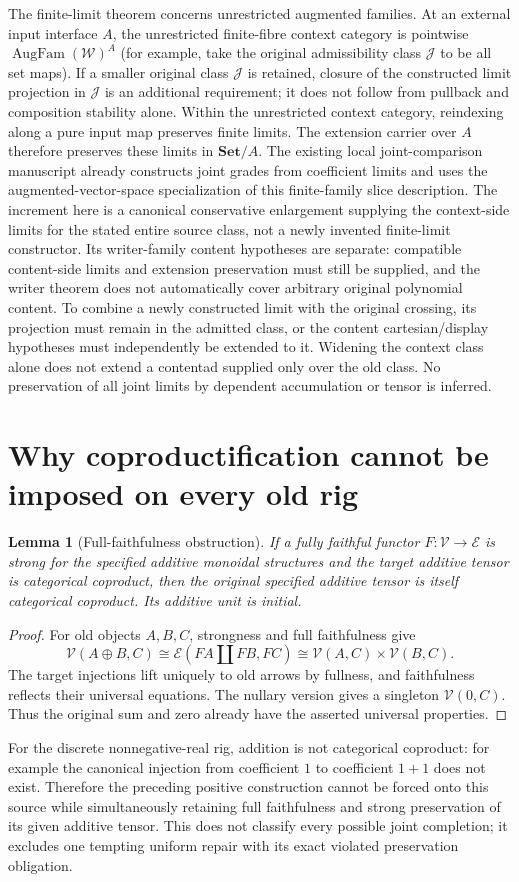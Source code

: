 \documentclass[11pt]{article}
\newtheorem{lemma}[theorem]{Lemma}
\newcommand{\V}{\mathcal V}
\newcommand{\W}{\mathcal W}
\newcommand{\Aug}{\operatorname{AugFam}}
\begin{document}
The finite-limit theorem concerns unrestricted augmented families. At an external input interface $A$, the unrestricted finite-fibre context category is pointwise $\Aug(\W)^A$ (for example, take the original admissibility class $\mathcal J$ to be all set maps). If a smaller original class $\mathcal J$ is retained, closure of the constructed limit projection in $\mathcal J$ is an additional requirement; it does not follow from pullback and composition stability alone. Within the unrestricted context category, reindexing along a pure input map preserves finite limits. The extension carrier over $A$ therefore preserves these limits in $\mathbf{Set}/A$. The existing local joint-comparison manuscript already constructs joint grades from coefficient limits and uses the augmented-vector-space specialization of this finite-family slice description. The increment here is a canonical conservative enlargement supplying the context-side limits for the stated entire source class, not a newly invented finite-limit constructor. Its writer-family content hypotheses are separate: compatible content-side limits and extension preservation must still be supplied, and the writer theorem does not automatically cover arbitrary original polynomial content. To combine a newly constructed limit with the original crossing, its projection must remain in the admitted class, or the content cartesian/display hypotheses must independently be extended to it. Widening the context class alone does not extend a contentad supplied only over the old class. No preservation of all joint limits by dependent accumulation or tensor is inferred.

\section{Why coproductification cannot be imposed on every old rig}
\begin{lemma}[Full-faithfulness obstruction]
If a fully faithful functor $F:\V\to\mathcal E$ is strong for the specified additive monoidal structures and the target additive tensor is categorical coproduct, then the original specified additive tensor is itself categorical coproduct. Its additive unit is initial.
\end{lemma}
\begin{proof}
For old objects $A,B,C$, strongness and full faithfulness give
\[
 \V(A\oplus B,C)
 \cong\mathcal E(FA\amalg FB,FC)
 \cong\V(A,C)\times\V(B,C).
\]
The target injections lift uniquely to old arrows by fullness, and faithfulness reflects their universal equations. The nullary version gives a singleton $\V(0,C)$. Thus the original sum and zero already have the asserted universal properties.
\end{proof}
For the discrete nonnegative-real rig, addition is not categorical coproduct: for example the canonical injection from coefficient $1$ to coefficient $1+1$ does not exist. Therefore the preceding positive construction cannot be forced onto this source while simultaneously retaining full faithfulness and strong preservation of its given additive tensor. This does not classify every possible joint completion; it excludes one tempting uniform repair with its exact violated preservation obligation.
\end{document}
